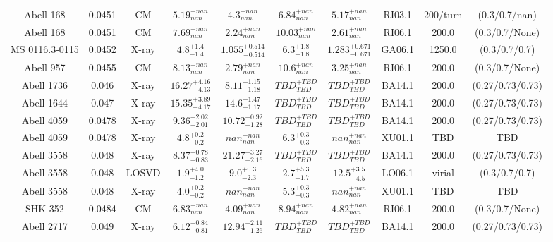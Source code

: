 \begin{table}
\begin{tabular}{cccccccccc}
Abell 168 & 0.0451 & CM & ${5.19}^{+nan}_{nan}$ & ${4.3}^{+nan}_{nan}$ & ${6.84}^{+nan}_{nan}$ & ${5.17}^{+nan}_{nan}$ & RI03.1 & 200/turn & (0.3/0.7/nan) \\
Abell 168 & 0.0451 & CM & ${7.69}^{+nan}_{nan}$ & ${2.24}^{+nan}_{nan}$ & ${10.03}^{+nan}_{nan}$ & ${2.61}^{+nan}_{nan}$ & RI06.1 & 200.0 & (0.3/0.7/None) \\
MS 0116.3-0115 & 0.0452 & X-ray & ${4.8}^{+1.4}_{-1.4}$ & ${1.055}^{+0.514}_{-0.514}$ & ${6.3}^{+1.8}_{-1.8}$ & ${1.283}^{+0.671}_{-0.671}$ & GA06.1 & 1250.0 & (0.3/0.7/0.7) \\
Abell 957 & 0.0455 & CM & ${8.13}^{+nan}_{nan}$ & ${2.79}^{+nan}_{nan}$ & ${10.6}^{+nan}_{nan}$ & ${3.25}^{+nan}_{nan}$ & RI06.1 & 200.0 & (0.3/0.7/None) \\
Abell 1736 & 0.046 & X-ray & ${16.27}^{+4.16}_{-4.13}$ & ${8.11}^{+1.15}_{-1.18}$ & ${TBD}^{+TBD}_{TBD}$ & ${TBD}^{+TBD}_{TBD}$ & BA14.1 & 200.0 & (0.27/0.73/0.73) \\
Abell 1644 & 0.047 & X-ray & ${15.35}^{+3.89}_{-4.17}$ & ${14.6}^{+1.47}_{-1.17}$ & ${TBD}^{+TBD}_{TBD}$ & ${TBD}^{+TBD}_{TBD}$ & BA14.1 & 200.0 & (0.27/0.73/0.73) \\
Abell 4059 & 0.0478 & X-ray & ${9.36}^{+2.02}_{-2.01}$ & ${10.72}^{+0.92}_{-1.28}$ & ${TBD}^{+TBD}_{TBD}$ & ${TBD}^{+TBD}_{TBD}$ & BA14.1 & 200.0 & (0.27/0.73/0.73) \\
Abell 4059 & 0.0478 & X-ray & ${4.8}^{+0.2}_{-0.2}$ & ${nan}^{+nan}_{nan}$ & ${6.3}^{+0.3}_{-0.3}$ & ${nan}^{+nan}_{nan}$ & XU01.1 & TBD & TBD \\
Abell 3558 & 0.048 & X-ray & ${8.37}^{+0.78}_{-0.83}$ & ${21.27}^{+3.27}_{-2.16}$ & ${TBD}^{+TBD}_{TBD}$ & ${TBD}^{+TBD}_{TBD}$ & BA14.1 & 200.0 & (0.27/0.73/0.73) \\
Abell 3558 & 0.048 & LOSVD & ${1.9}^{+4.0}_{-1.2}$ & ${9.0}^{+0.3}_{-2.3}$ & ${2.7}^{+5.3}_{-1.7}$ & ${12.5}^{+3.5}_{-4.5}$ & LO06.1 & virial & (0.3/0.7/0.7) \\
Abell 3558 & 0.048 & X-ray & ${4.0}^{+0.2}_{-0.2}$ & ${nan}^{+nan}_{nan}$ & ${5.3}^{+0.3}_{-0.3}$ & ${nan}^{+nan}_{nan}$ & XU01.1 & TBD & TBD \\
SHK 352 & 0.0484 & CM & ${6.83}^{+nan}_{nan}$ & ${4.09}^{+nan}_{nan}$ & ${8.94}^{+nan}_{nan}$ & ${4.82}^{+nan}_{nan}$ & RI06.1 & 200.0 & (0.3/0.7/None) \\
Abell 2717 & 0.049 & X-ray & ${6.12}^{+0.84}_{-0.81}$ & ${12.94}^{+2.11}_{-1.26}$ & ${TBD}^{+TBD}_{TBD}$ & ${TBD}^{+TBD}_{TBD}$ & BA14.1 & 200.0 & (0.27/0.73/0.73) \\

\end{tabular}
\end{table}
